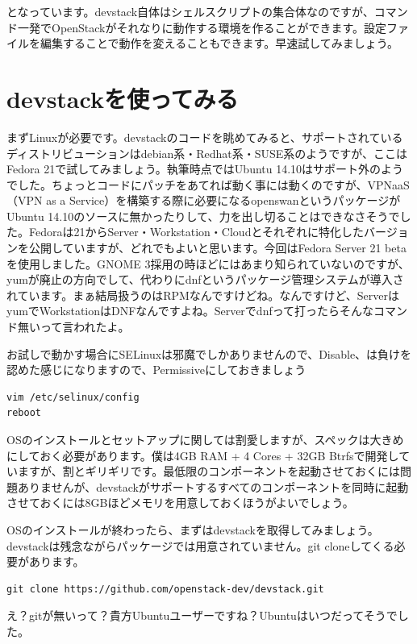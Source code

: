 \documentclass[9pt,b5paper,tombo,openany]{jsbook}
\begin{document}
となっています。devstack自体はシェルスクリプトの集合体なのですが、コマンド一発でOpenStackがそれなりに動作する環境を作ることができます。設定ファイルを編集することで動作を変えることもできます。早速試してみましょう。

\section{devstackを使ってみる}

まずLinuxが必要です。devstackのコードを眺めてみると、サポートされているディストリビューションはdebian系・Redhat系・SUSE系のようですが、ここはFedora 21で試してみましょう。執筆時点ではUbuntu 14.10はサポート外のようでした。ちょっとコードにパッチをあてれば動く事には動くのですが、VPNaaS（VPN as a Service）を構築する際に必要になるopenswanというパッケージがUbuntu 14.10のソースに無かったりして、力を出し切ることはできなさそうでした。Fedoraは21からServer・Workstation・Cloudとそれぞれに特化したバージョンを公開していますが、どれでもよいと思います。今回はFedora Server 21 betaを使用しました。GNOME 3採用の時ほどにはあまり知られていないのですが、yumが廃止の方向でして、代わりにdnfというパッケージ管理システムが導入されています。まぁ結局扱うのはRPMなんですけどね。なんですけど、ServerはyumでWorkstationはDNFなんですよね。Serverでdnfって打ったらそんなコマンド無いって言われたよ。

お試しで動かす場合にSELinuxは邪魔でしかありませんので、Disable、は負けを認めた感じになりますので、Permissiveにしておきましょう

\begin{lstlisting}
vim /etc/selinux/config
reboot
\end{lstlisting}

OSのインストールとセットアップに関しては割愛しますが、スペックは大きめにしておく必要があります。僕は4GB RAM + 4 Cores + 32GB Btrfsで開発していますが、割とギリギリです。最低限のコンポーネントを起動させておくには問題ありませんが、devstackがサポートするすべてのコンポーネントを同時に起動させておくには8GBほどメモリを用意しておくほうがよいでしょう。

OSのインストールが終わったら、まずはdevstackを取得してみましょう。devstackは残念ながらパッケージでは用意されていません。git cloneしてくる必要があります。

\begin{lstlisting}
git clone https://github.com/openstack-dev/devstack.git
\end{lstlisting}


え？gitが無いって？貴方Ubuntuユーザーですね？Ubuntuはいつだってそうでした。
\end{document}
